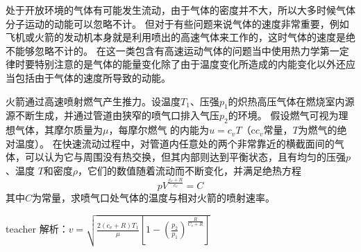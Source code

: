 处于开放环境的气体有可能发生流动，由于气体的密度并不大，所以大多时候气体分子运动的动能可以忽略不计。
但对于有些问题来说气体的速度非常重要，例如飞机或火箭的发动机本身就是利用喷出的高速气体来工作的，这时气体的速度是绝不能够忽略不计的。
在这一类包含有高速运动气体的问题当中使用热力学第一定律时要特别注意的是气体的能量变化除了由于温度变化所造成的内能变化以外还应当包括由于气体的速度所导致的动能。



\begin{example}
火箭通过高速喷射燃气产生推力。设温度$T_1$、压强$ p_1$的炽热高压气体在燃烧室内源源不断生成，并通过管道由狭窄的喷气口排入气压$ p_2$的环境。
假设燃气可视为理想气体，其摩尔质量为$\mu$，每摩尔燃气 的内能为$ u=c_vT$（c$c_v$常量，$T$为燃气的绝对温度）。
在快速流动过程中，对管道内任意处的两个非常靠近的横截面间的气体，可以认为它与周围没有热交换，但其内部则达到平衡状态，且有均匀的压强$ p$、温度
$T$和密度$\rho$，它们的数值随着流动而不断变化，并满足绝热方程
\[pV^{\frac{c_v+R}{c_v}}=C\]
其中$C$为常量，求喷气口处气体的温度与相对火箭的喷射速率。
\begin{taggedblock}{teacher}
\newline
解析：$v=\sqrt{\frac{2(c_v+R)T_1}{\mu}[1-(\frac{p_2}{p_1})^\frac{R}{C_v+R}]}$
\end{taggedblock}
\end{example}

